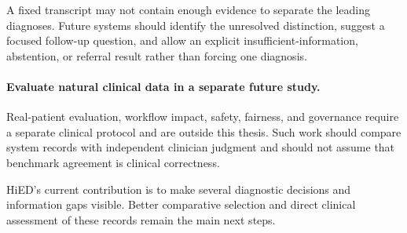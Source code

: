 A fixed transcript may not contain enough evidence to separate the leading diagnoses. Future systems should identify the unresolved distinction, suggest a focused follow-up question, and allow an explicit insufficient-information, abstention, or referral result rather than forcing one diagnosis.

\paragraph{Evaluate natural clinical data in a separate future study.}

Real-patient evaluation, workflow impact, safety, fairness, and governance require a separate clinical protocol and are outside this thesis. Such work should compare system records with independent clinician judgment and should not assume that benchmark agreement is clinical correctness.

HiED's current contribution is to make several diagnostic decisions and information gaps visible. Better comparative selection and direct clinical assessment of these records remain the main next steps.
